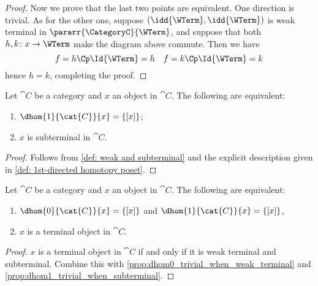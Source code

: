 \begin{proof}
        Now we prove that the last two points are equivalent. One direction is trivial. As for the other one, suppose $(\idd{\WTerm}, \idd{\WTerm})$ is weak terminal in $\pararr{\CategoryC}{\WTerm}$, and suppose that both $h, k\colon x \to \WTerm$ make the diagram above commute. Then we have
        \begin{equation*}
            f = h \Cp \Id{\WTerm} = h \quad f = k \Cp \Id{\WTerm} = k
        \end{equation*}
        hence $h=k$, completing the proof.
    \end{proof}
    
    \begingroup
    \def\theproposition{\ref{prop:dhom1_trivial_when_subterminal}}
    \begin{proposition}
        Let $\cat{C}$ be a category and $x$ an object in $\cat{C}$.
        The following are equivalent:
        \begin{enumerate}[label=(\alph*)]
            \item $\dhom{1}{\cat{C}}{x} = \{[x]\}$;
            \item $x$ is subterminal in $\cat{C}$.
        \end{enumerate}
    \end{proposition}
    \addtocounter{proposition}{-1}
    \endgroup
    \begin{proof}
        Follows from \autoref{def: weak and subterminal} and the explicit description given in \autoref{def: 1st-directed homotopy poset}.
    \end{proof}

    \begingroup
    \def\thecorollary{\ref{prop:dhoms_trivial_when_terminal}}
    \begin{corollary}
        Let $\cat{C}$ be a category and $x$ an object in $\cat{C}$.
        The following are equivalent:
        \begin{enumerate}[label=(\alph*)]
            \item $\dhom{0}{\cat{C}}{x} = \{[x]\}$ and $\dhom{1}{\cat{C}}{x} = \{[x]\}$,
            \item $x$ is a terminal object in $\cat{C}$.
        \end{enumerate}
    \end{corollary}
    \addtocounter{corollary}{-1}
    \endgroup
    \begin{proof}
        $x$ is a terminal object in $\cat{C}$ if and only if it is weak terminal and subterminal. Combine this with \autoref{prop:dhom0_trivial_when_weak_terminal} and \autoref{prop:dhom1_trivial_when_subterminal}.
    \end{proof}


